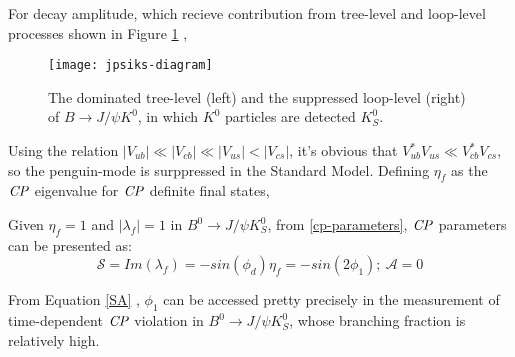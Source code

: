 \begin{comment}
Usually, $S_f$ provides a good sensitivity to $\phi_1$ in Eq(1.42) by replacing $\phi_d$ inside $\lambda_f$ since the rest two equations canceled out the complex phase of $(q/p)$. For instance, in the process of  $b\to \bar{c}cs$ ,the amplitude contributions from tree level and loop level diagram can be written in a form as follows using the CKM unitary condition: 
\end{comment}
For decay amplitude, which recieve contribution from tree-level and loop-level processes shown in Figure \ref{fig:jpsiks-diagram} , 

\begin{figure}[htpb]
	\centering
	\texttt{[image: jpsiks-diagram]}
	\label{fig:jpsiks-diagram}
	\caption{ The dominated tree-level (left) and the suppressed loop-level (right) of $B\to J/\psi K^0$, in which $K^0$ particles are detected $K_S^0$. \cite{wishahi2014measurement} }
\end{figure}


Using the relation $|V_{ub}|\ll |V_{cb}|\ll|V_{us}|<|V_{cs}|$, it's obvious that $V^*_{ub}V_{us} \ll V^*_{cb}V_{cs}$, so the penguin-mode is surppressed in the Standard Model. Defining $\eta_f$ as the $\it{CP}$ eigenvalue for $\it{CP}$ definite final states, 


Given $\eta_f=1$ and $|\lambda_f|=1$ in $B^0 \to J/\psi K^0_S$, from \ref{cp-parameters}, $\it{CP}$ parameters can be presented as: 
\begin{equation}\label{SA}
\mathcal{S} = Im(\lambda_f)
=-sin(\phi_d)\eta_f=-sin(2\phi_1) ; \: \mathcal{A} = 0
\end{equation}

From Equation \ref{SA} , $\phi_1$ can be accessed pretty precisely in the measurement of time-dependent $\it{CP}$ violation in $B^0 \to J/\psi K^0_S$, whose branching fraction is relatively high. 
\begin{comment}
In the $b\to q\bar{q}s$ process where flavor $q$ is not charm, similar to the discussion above, we can extract $\phi_1$ using the same method. Moreover, it provides a penguin-dominated process which is sensitive to the contribution of New Physics, which includes the $B^0_d\to K^0_S K^0_S K^0_S$ decay. In the next section, it's clear that such decay process is important to provide additional insight in seeking the effect beyond the SM (BSM contribution).
\end{comment}



